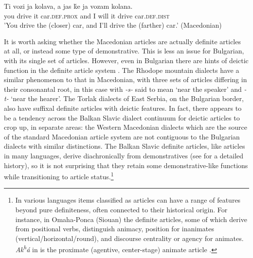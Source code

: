 \documentclass[output=paper,
colorlinks,
citecolor=brown,
newtxmath
]{langscibook}
\begin{document}
\ea \label{driving}
\gll Ti vozi ja kolava, a jas ḱe ja vozam kolana.\\
you drive it car.\textsc{def.prox} and I will it drive car.\textsc{def.dist}\\
\glt'You drive the (closer) car, and I’ll drive the (farther) car.' \hfill(Macedonian)
\z

    \largerpage[2]

\noindent It is worth asking whether the Macedonian articles are actually definite articles at all, or instead some type of demonstrative. This is less an issue for Bulgarian, with its single set of articles. However, even in Bulgarian there are hints of deictic function in the definite article system \citep{Mladenova2007}. The Rhodope mountain dialects have a similar phenomenon to that in Macedonian, with three sets of articles differing in their consonantal root, in this case with \textit{-s-} said to mean `near the speaker' and \textit{-t-} `near the hearer'. The Torlak dialects of East Serbia, on the Bulgarian border, also have suffixal definite articles with deictic features. In fact, there appears to be a tendency across the Balkan Slavic dialect continuum for deictic articles to crop up, in separate areas: the Western Macedonian dialects which are the source of the standard Macedonian article system are not contiguous to the Bulgarian dialects with similar distinctions. The Balkan Slavic definite articles, like articles in many languages, derive diachronically from demonstratives (see \citealt{Mladenova2007} for a detailed history), so it is not surprising that they retain some demonstrative-like functions while transitioning to article status.\footnote{In various languages items classified as articles can have a range of features beyond pure definiteness, often connected to their historical origin. For instance, in Omaha-Ponca (Siouan) the definite articles, some of which derive from positional verbs, distinguish animacy, position for inanimates (vertical/horizontal/round), and discourse centrality or agency for animates.  \textit{Ak\textsuperscript{h}á} in  is the proximate (agentive, center-stage) animate article \citep{Eschenberg2005}.}
\end{document}
